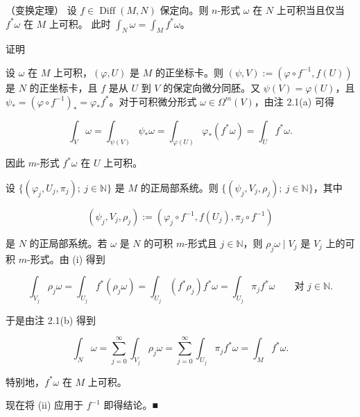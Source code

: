 \begin{theorem}

（变换定理） 设 $ f \in \operatorname{Diff}(M,N) $ 保定向。则 $ n $-形式 $ \omega $ 在 $ N $ 上可积当且仅当 $ f^*\omega $ 在 $ M $ 上可积。 此时 $ \int_N \omega = \int_M f^*\omega $。

证明

\begin{subitems}
\item

设 $ \omega $ 在 $ M $ 上可积，$ (\varphi, U) $ 是 $ M $ 的正坐标卡。则 $ (\psi, V) := (\varphi \circ f^{-1}, f(U)) $ 是 $ N $ 的正坐标卡，且 $ f $ 是从 $ U $ 到 $ V $ 的保定向微分同胚。又 $ \psi(V) = \varphi(U) $，且 $ \psi_* = (\varphi \circ f^{-1})_* = \varphi_* f^* $。对于可积微分形式 $ \omega \in \Omega^m(V) $，由注 2.1(a) 可得

\[
\int_V \omega = \int_{\psi(V)} \psi_*\omega = \int_{\varphi(U)} \varphi_*(f^*\omega) = \int_U f^*\omega .
\]

因此 $ m $-形式 $ f^*\omega $ 在 $ U $ 上可积。

\item

设 $ \{ (\varphi_j, U_j, \pi_j) ;\ j \in \mathbb{N} \} $ 是 $ M $ 的正局部系统。则 $ \{ (\psi_j, V_j, \rho_j) ;\ j \in \mathbb{N} \} $，其中

\[
(\psi_j, V_j, \rho_j) := (\varphi_j \circ f^{-1}, f(U_j), \pi_j \circ f^{-1})
\]

是 $ N $ 的正局部系统。若 $ \omega $ 是 $ N $ 的可积 $ m $-形式且 $ j \in \mathbb{N} $，则 $ \rho_j \omega \mid V_j $ 是 $ V_j $ 上的可积 $ m $-形式。由 (i) 得到

\[
\int_{V_j} \rho_j \omega = \int_{U_j} f^*(\rho_j \omega) = \int_{U_j} (f^*\rho_j) f^*\omega = \int_{U_j} \pi_j f^*\omega \qquad \text{对 } j \in \mathbb{N} .
\]

于是由注 2.1(b) 得到

\[
\int_N \omega = \sum_{j=0}^{\infty} \int_{V_j} \rho_j \omega = \sum_{j=0}^{\infty} \int_{U_j} \pi_j f^*\omega = \int_M f^*\omega .
\]

特别地，$ f^*\omega $ 在 $ M $ 上可积。

\item

现在将 (ii) 应用于 $ f^{-1} $ 即得结论。\nobreak\hspace{0.35em}■

\end{subitems}

\end{theorem}

